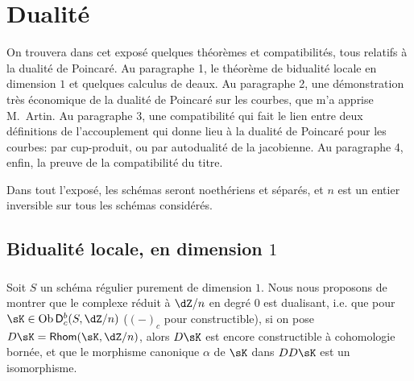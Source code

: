 
\chapter{Dualité}\label{V}




















On trouvera dans cet expos\'e quelques th\'eor\`emes et compatibilit\'es, tous 
relatifs \`a la dualit\'e de Poincar\'e. Au paragraphe 1, le th\'eor\`eme de 
bidualit\'e locale en dimension $1$ \cite[I.5.1]{sga5} et quelques calculus de 
deaux. Au paragraphe 2, une d\'emonstration tr\`es \'economique de la dualit\'e 
de Poincar\'e sur les courbes, que m'a apprise M.\ Artin. Au paragraphe 3, une 
compatibilit\'e qui fait le lien entre deux d\'efinitions de l'accouplement qui 
donne lieu \`a la dualit\'e de Poincar\'e pour les courbes: par cup-produit, ou 
par autodualit\'e de la jacobienne. Au paragraphe 4, enfin, la preuve de la 
compatibilit\'e du titre. 

Dans tout l'expos\'e, les sch\'emas seront noeth\'eriens et s\'epar\'es, et $n$ 
est un entier inversible sur tous les sch\'emas consid\'er\'es. 










\section{Bidualit\'e locale, en dimension \texorpdfstring{$1$}{1}}\label{V:1}





\subsection{}\label{V:1-1}

Soit $S$ un sch\'ema r\'egulier purement de dimension $1$. Nous nous proposons 
de montrer que le complexe r\'eduit \`a $\dZ/n$ en degr\'e $0$ est 
dualisant, i.e. que pour $\sK\in \ob\D_c^b(S,\dZ/n)$ ($(-)_c$ pour 
constructible), si on pose $D\sK=\rHom(\sK,\dZ/n)$, alors $D\sK$ est encore 
constructible \`a cohomologie born\'ee, et que le morphisme canonique $\alpha$ 
de $\sK$ dans $D D\sK$ est un isomorphisme. 

